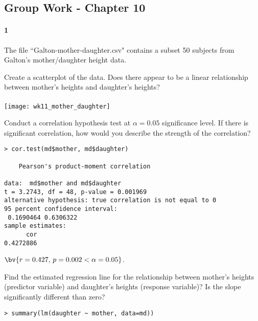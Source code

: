 \documentclass{article}
\begin{document}
\begin{flushleft}
\section*{Group Work - Chapter 10}
\paragraph{1} The file ``Galton-mother-daughter.csv" contains a subset 50 subjects from Galton's mother/daughter height data.
\begin{enumalpha}
\item Create a scatterplot of the data. Does there appear to be a linear relationship between mother's heights and daughter's heights?\\
\medskip
{}\\
\medskip
\texttt{[image: wk11\_mother\_daughter]}
\vspace{.25in}

\item Conduct a correlation hypothesis test at $\alpha = 0.05$ significance level. If there is significant correlation, how would you describe the strength of the correlation?\\
\medskip
\begin{verbatim}
> cor.test(md$mother, md$daughter)

	Pearson's product-moment correlation

data:  md$mother and md$daughter
t = 3.2743, df = 48, p-value = 0.001969
alternative hypothesis: true correlation is not equal to 0
95 percent confidence interval:
 0.1690464 0.6306322
sample estimates:
      cor 
0.4272886 
\end{verbatim}

$\bv{r = 0.427, \, p = 0.002 < \alpha = 0.05}$. 

\newpage
\item Find the estimated regression line for the relationship between mother's heights (predictor variable) and daughter's heights (response variable)? Is the slope significantly different than zero?\\
\medskip
\begin{verbatim}
> summary(lm(daughter ~ mother, data=md))


\end{verbatim}
\end{enumalpha}
\end{flushleft}
\end{document}
